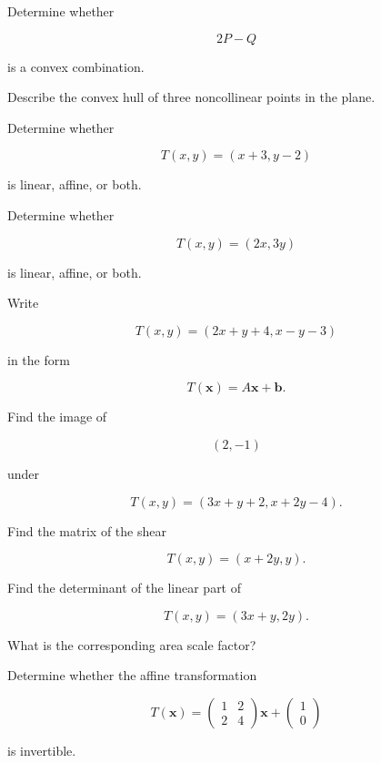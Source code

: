 \begin{exercise}[2]
Determine whether

\[
2P-Q
\]

is a convex combination.
\end{exercise}

\begin{exercise}[2]
Describe the convex hull of three noncollinear points in the plane.
\end{exercise}

\begin{exercise}[1]
Determine whether

\[ T(x,y)=(x+3,y-2) \]

is linear, affine, or both.
\end{exercise}

\begin{exercise}[1]
Determine whether

\[ T(x,y)=(2x,3y) \]

is linear, affine, or both.
\end{exercise}

\begin{exercise}[2]
Write

\[ T(x,y)=(2x+y+4,x-y-3) \]

in the form

\[ T(\mathbf{x})=A\mathbf{x}+\mathbf{b}. \]
\end{exercise}

\begin{exercise}[2]
Find the image of

\[ (2,-1) \]

under

\[ T(x,y)=(3x+y+2,x+2y-4). \]
\end{exercise}

\begin{exercise}[2]
Find the matrix of the shear

\[ T(x,y)=(x+2y,y). \]
\end{exercise}

\begin{exercise}[2]
Find the determinant of the linear part of

\[ T(x,y)=(3x+y,2y). \]

What is the corresponding area scale factor?
\end{exercise}

\begin{exercise}[2]
Determine whether the affine transformation

\[
T(\mathbf{x})
=
\begin{pmatrix}
1&2\\
2&4
\end{pmatrix}\mathbf{x}
+
\begin{pmatrix}
1\\
0
\end{pmatrix}
\]

is invertible.
\end{exercise}

